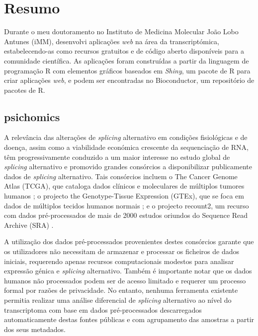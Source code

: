 \chapter*{Resumo}

Durante o meu doutoramento no Instituto de Medicina Molecular João Lobo Antunes (iMM), desenvolvi aplicações \emph{web} na área da transcriptómica, estabelecendo-as como recursos gratuitos e de código aberto disponíveis para a comunidade científica. As aplicações foram construídas a partir da linguagem de programação R com elementos gráficos baseados em \emph{Shiny}, um pacote de R para criar aplicações \emph{web}, e podem ser encontradas no Bioconductor, um repositório de pacotes de R.

\section*{psichomics}

A relevância das alterações de \emph{splicing} alternativo em condições fisiológicas e de doença, assim como a viabilidade económica crescente da sequenciação de RNA, têm progressivamente conduzido a um maior interesse no estudo global de \emph{splicing} alternativo \cite{wang:2008wa,tsai:2015ve,danan-gotthold:2015ut,chhibber:2017wm,climente-gonzalez:2017uj} e promovido grandes consórcios a disponibilizar publicamente dados de \emph{splicing} alternativo. Tais consórcios incluem o The Cancer Genome Atlas (TCGA), que cataloga dados clínicos e moleculares de múltiplos tumores humanos \cite{chang:2013ww}; o projecto the Genotype-Tissue Expression (GTEx), que se foca em dados de múltiplos tecidos humanos normais \cite{lonsdale:2013uo}; e o projecto recount2, um recurso com dados pré-processados de mais de 2000 estudos oriundos do Sequence Read Archive (SRA) \cite{collado-torres:2017uw}.

A utilização dos dados pré-processados provenientes destes consórcios garante que os utilizadores não necessitam de armazenar e processar os ficheiros de dados iniciais, requerendo apenas recursos computacionais modestos para analisar expressão génica e \emph{splicing} alternativo. Também é importante notar que os dados humanos não processados podem ser de acesso limitado e requerer um processo formal por razões de privacidade. No entanto, nenhuma ferramenta existente permitia realizar uma análise diferencial de \emph{splicing} alternativo ao nível do transcriptoma com base em dados pré-processados descarregados automaticamente destas fontes públicas e com agrupamento das amostras a partir dos seus metadados.

